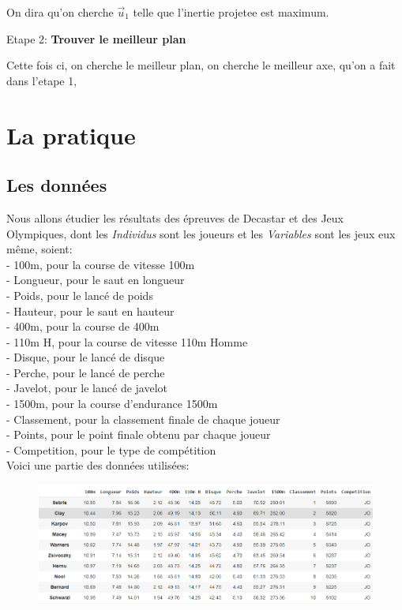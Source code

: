 \documentclass{article}
\begin{document}
On dira qu’on cherche $\vec{u}_1$ telle que l’inertie projetee est maximum.

\begin{flushleft}
Etape 2: \textbf{Trouver le meilleur plan}
\end{flushleft}

Cette fois ci, on cherche le meilleur plan, on cherche le meilleur axe, qu'on a fait dans l'etape 1, 





\newpage

\section{La pratique}

\subsection{Les données}

Nous allons étudier les résultats des épreuves de Decastar et des Jeux Olympiques, dont les \textit{Individus} sont les joueurs et les \textit{Variables} sont les jeux eux même, soient:
\newline
\\
- 100m, pour la course de vitesse 100m \\
- Longueur, pour le saut en longueur \\
- Poids, pour le lancé de poids \\
- Hauteur, pour le saut en hauteur \\
- 400m, pour la course de 400m \\
- 110m H, pour la course de vitesse 110m Homme \\
- Disque, pour le lancé de disque \\
- Perche, pour le lancé de perche \\
- Javelot, pour le lancé de javelot \\
- 1500m, pour la course d'endurance 1500m \\
- Classement, pour la classement finale de chaque joueur \\
- Points, pour le point finale obtenu par chaque joueur \\
- Competition, pour le type de compétition \\

Voici une partie des données utilisées:

\begin{figure}[h!]
\includegraphics[width=\linewidth]{images/data_initials.png}
\end{figure}
\end{document}

